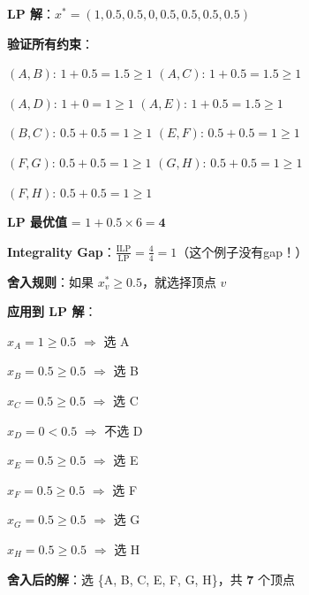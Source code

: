\documentclass[12pt, a4paper]{ctexart}
\begin{document}
\begin{blackboard}[LP 松弛的详细分析]

\textbf{LP 解}：$x^* = (1, 0.5, 0.5, 0, 0.5, 0.5, 0.5, 0.5)$

\textbf{验证所有约束}：

$(A,B)$: $1 + 0.5 = 1.5 \geq 1$ \checkmark \quad $(A,C)$: $1 + 0.5 = 1.5 \geq 1$ \checkmark

$(A,D)$: $1 + 0 = 1 \geq 1$ \checkmark \quad\quad $(A,E)$: $1 + 0.5 = 1.5 \geq 1$ \checkmark

$(B,C)$: $0.5 + 0.5 = 1 \geq 1$ \checkmark \quad $(E,F)$: $0.5 + 0.5 = 1 \geq 1$ \checkmark

$(F,G)$: $0.5 + 0.5 = 1 \geq 1$ \checkmark \quad $(G,H)$: $0.5 + 0.5 = 1 \geq 1$ \checkmark

$(F,H)$: $0.5 + 0.5 = 1 \geq 1$ \checkmark

\textbf{LP 最优值} = $1 + 0.5 \times 6 = \mathbf{4}$

\textbf{Integrality Gap}：$\frac{\text{ILP}}{\text{LP}} = \frac{4}{4} = 1$（这个例子没有gap！）

\end{blackboard}

\begin{blackboard}[确定性舍入]

\textbf{舍入规则}：如果 $x_v^* \geq 0.5$，就选择顶点 $v$

\textbf{应用到 LP 解}：

$x_A = 1 \geq 0.5$ $\Rightarrow$ 选 A \checkmark

$x_B = 0.5 \geq 0.5$ $\Rightarrow$ 选 B \checkmark

$x_C = 0.5 \geq 0.5$ $\Rightarrow$ 选 C \checkmark

$x_D = 0 < 0.5$ $\Rightarrow$ 不选 D

$x_E = 0.5 \geq 0.5$ $\Rightarrow$ 选 E \checkmark

$x_F = 0.5 \geq 0.5$ $\Rightarrow$ 选 F \checkmark

$x_G = 0.5 \geq 0.5$ $\Rightarrow$ 选 G \checkmark

$x_H = 0.5 \geq 0.5$ $\Rightarrow$ 选 H \checkmark

\textbf{舍入后的解}：选 \{A, B, C, E, F, G, H\}，共 \textbf{7} 个顶点

\end{blackboard}
\end{document}
